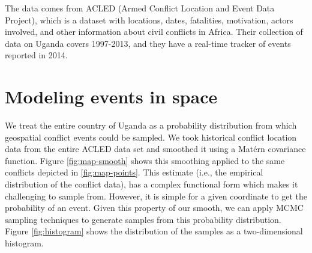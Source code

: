 \documentclass[a0,final]{a0poster}
\begin{document}
\begin{multicols}{3}
\noindent The data comes from ACLED (Armed Conflict Location and Event Data Project), which is a dataset with locations, dates, fatalities, motivation, actors involved, and other information about civil conflicts in Africa. Their collection of data on Uganda covers 1997-2013, and they have a real-time tracker of events reported in 2014.\cite{ACLED}

\vspace{-10mm}

\section*{Modeling events in space}

\vspace{-6mm}

We treat the entire country of Uganda as a probability distribution from which geospatial conflict events could be sampled.  We took historical conflict location data from the entire ACLED data set and smoothed it using a Mat\'{e}rn covariance function.  Figure \ref{fig:map-smooth} shows this smoothing applied to the same conflicts depicted in \ref{fig:map-points}. This estimate (i.e., the empirical distribution of the conflict data), has a complex functional form which makes it challenging to sample from. However, it is simple for a given coordinate to get the probability of an event. Given this property of our smooth, we can apply MCMC sampling techniques to generate samples from this probability distribution. Figure \ref{fig:histogram} shows the distribution of the samples as a two-dimensional histogram.


\end{multicols}
\end{document}
